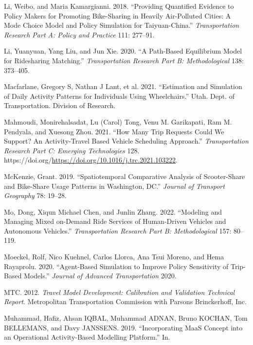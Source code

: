 \documentclass[12pt, oneside, openright]{byuthesis}
\newlength{\cslhangindent}
\newlength{\cslentryspacingunit} %
\newenvironment{CSLReferences}[2] %
 {%
  \setlength{\parindent}{0pt}
  \ifodd #1
  \let\oldpar\par
  \def\par{\hangindent=\cslhangindent\oldpar}
  \fi
  \setlength{\parskip}{#2\cslentryspacingunit}
 }%
 {}
\begin{document}
\begin{CSLReferences}{1}{0}
\leavevmode{}%
Li, Weibo, and Maria Kamargianni. 2018. {``Providing Quantified Evidence to Policy Makers for Promoting Bike-Sharing in Heavily Air-Polluted Cities: A Mode Choice Model and Policy Simulation for Taiyuan-China.''} \emph{Transportation Research Part A: Policy and Practice} 111: 277--91.

\leavevmode{}%
Li, Yuanyuan, Yang Liu, and Jun Xie. 2020. {``A Path-Based Equilibrium Model for Ridesharing Matching.''} \emph{Transportation Research Part B: Methodological} 138: 373--405.

\leavevmode{}%
Macfarlane, Gregory S, Nathan J Lant, et al. 2021. {``Estimation and Simulation of Daily Activity Patterns for Individuals Using Wheelchairs.''} Utah. Dept. of Transportation. Division of Research.

\leavevmode{}%
Mahmoudi, Monirehalsadat, Lu (Carol) Tong, Venu M. Garikapati, Ram M. Pendyala, and Xuesong Zhou. 2021. {``How Many Trip Requests Could We Support? An Activity-Travel Based Vehicle Scheduling Approach.''} \emph{Transportation Research Part C: Emerging Technologies} 128. https://doi.org/\url{https://doi.org/10.1016/j.trc.2021.103222}.

\leavevmode{}%
McKenzie, Grant. 2019. {``Spatiotemporal Comparative Analysis of Scooter-Share and Bike-Share Usage Patterns in Washington, DC.''} \emph{Journal of Transport Geography} 78: 19--28.

\leavevmode{}%
Mo, Dong, Xiqun Michael Chen, and Junlin Zhang. 2022. {``Modeling and Managing Mixed on-Demand Ride Services of Human-Driven Vehicles and Autonomous Vehicles.''} \emph{Transportation Research Part B: Methodological} 157: 80--119.

\leavevmode{}%
Moeckel, Rolf, Nico Kuehnel, Carlos Llorca, Ana Tsui Moreno, and Hema Rayaprolu. 2020. {``Agent-Based Simulation to Improve Policy Sensitivity of Trip-Based Models.''} \emph{Journal of Advanced Transportation} 2020.

\leavevmode{}%
MTC. 2012. \emph{Travel Model Development: Calibration and Validation Technical Report}. Metropolitan Transportation Commission with Parsons Brinckerhoff, Inc.

\leavevmode{}%
Muhammad, Hafiz, Ahsan IQBAL, Muhammad ADNAN, Bruno KOCHAN, Tom BELLEMANS, and Davy JANSSENS. 2019. {``Incorporating MaaS Concept into an Operational Activity-Based Modelling Platform.''} In.


\end{CSLReferences}
\end{document}
